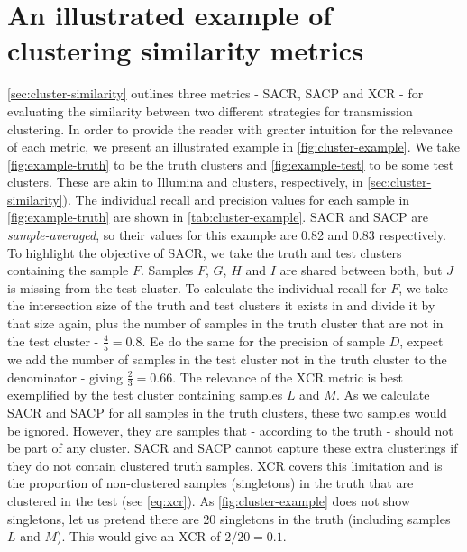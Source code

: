 
\section{An illustrated example of clustering similarity metrics}
\label{app:cluster-example}

\autoref{sec:cluster-similarity} outlines three metrics - SACR, SACP and XCR - for evaluating the similarity between two different strategies for transmission clustering. In order to provide the reader with greater intuition for the relevance of each metric, we present an illustrated example in \autoref{fig:cluster-example}. We take \autoref{fig:example-truth} to be the truth clusters and \autoref{fig:example-test} to be some test clusters. These are akin to Illumina and \ont{} clusters, respectively, in \autoref{sec:cluster-similarity}). The individual recall and precision values for each sample in \autoref{fig:example-truth} are shown in \autoref{tab:cluster-example}. SACR and SACP are \emph{sample-averaged}, so their values for this example are 0.82 and 0.83 respectively. To highlight the objective of SACR, we take the truth and test clusters containing the sample $F$. Samples $F$, $G$, $H$ and $I$ are shared between both, but $J$ is missing from the test cluster. To calculate the individual recall for $F$, we take the intersection size of the truth and test clusters it exists in and divide it by that size again, plus the number of samples in the truth cluster that are not in the test cluster - $\frac{4}{5}=0.8$. Ee do the same for the precision of sample $D$, expect we add the number of samples in the test cluster not in the truth cluster to the denominator - giving $\frac{2}{3}=0.66$. The relevance of the XCR metric is best exemplified by the test cluster containing samples $L$ and $M$. As we calculate SACR and SACP for all samples in the truth clusters, these two samples would be ignored. However, they are samples that - according to the truth - should not be part of any cluster. SACR and SACP cannot capture these extra clusterings if they do not contain clustered truth samples. XCR covers this limitation and is the proportion of non-clustered samples (singletons) in the truth that are clustered in the test (see \autoref{eq:xcr}). As \autoref{fig:cluster-example} does not show singletons, let us pretend there are 20 singletons in the truth (including samples $L$ and $M$). This would give an XCR of $2/20=0.1$.

